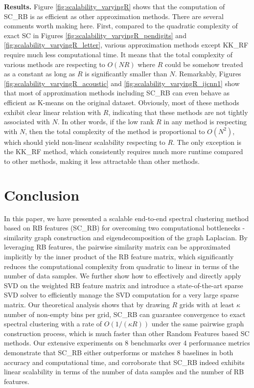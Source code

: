 \documentclass[sigconf]{acmart}
\newcommand{\1}{\boldsymbol{1}}
\newcommand{\0}{\boldsymbol{0}}
\begin{document}
\textbf{Results.} Figure \ref{fig:scalability_varyingR} shows that the computation of SC\_RB is as efficient as other approximation methods. There are several comments worth making here. First, compared to the quadratic complexity of exact SC in Figures \ref{fig:scalability_varyingR_pendigits} and \ref{fig:scalability_varyingR_letter}, various approximation methods except KK\_RF require much less computational time. It means that the total complexity of various methods are respecting to $O(NR)$ where $R$ could be somehow treated as a constant as long as $R$ is significantly smaller than $N$. Remarkably, Figures \ref{fig:scalability_varyingR_acoustic} and \ref{fig:scalability_varyingR_ijcnn1} show that most of approximation methods including SC\_RB can even behave as efficient as K-means on the original dataset. Obviously, most of these methods exhibit clear linear relation with $R$, indicating that these methods are not tightly associated with $N$. In other words, if the low rank $R$ in any method is respecting with $N$, then the total complexity of the method is proportional to $O(N^2)$, which should yield non-linear scalability respecting to $R$. The only exception is the KK\_RF method, which consistently requires much more runtime compared to other methods, making it less attractable than other methods.   



\section{Conclusion}
In this paper, we have presented a scalable end-to-end spectral clustering method based on RB features (SC\_RB) for overcoming two computational bottlenecks - similarity graph construction and eigendecomposition of the graph Laplacian. By leveraging RB features, the pairwise similarity matrix can be approximated implicitly by the inner product of the RB feature matrix, which significantly reduces the computational complexity from quadratic to linear in terms of the number of data samples. We further show how to effectively and directly apply SVD  on the weighted RB feature matrix and introduce a state-of-the-art sparse SVD solver to efficiently manage the SVD computation for a very large sparse matrix. Our theoretical analysis shows that by drawing $R$ grids with at least $\kappa$ number of non-empty bins per grid, SC\_RB can guarantee convergence to exact spectral clustering with a rate of $O(1/(\kappa R))$ under the same pairwise graph construction process, which is much faster than other Random Features based SC methods.
Our extensive experiments on 8 benchmarks over 4 performance metrics demonstrate that SC\_RB either outperforms or matches 8 baselines in both accuracy and computational time, and corroborate that SC\_RB indeed exhibits linear scalability in terms of the number of data samples and the number of RB features.




 


\end{document}
